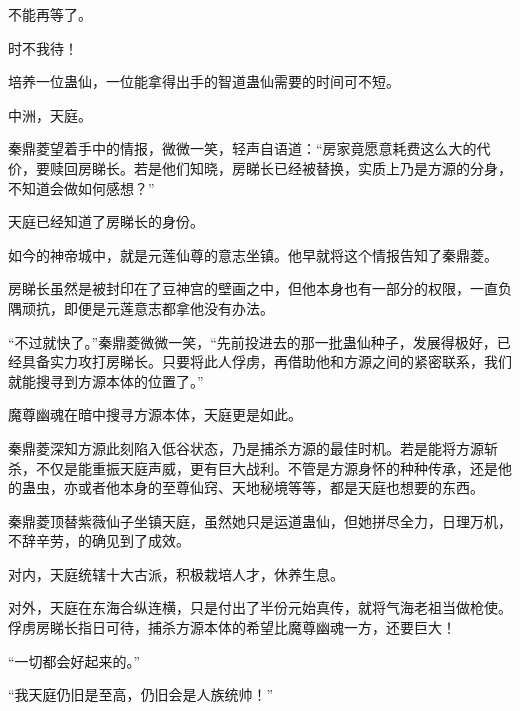 \begin{this_body}
不能再等了。

时不我待！

培养一位蛊仙，一位能拿得出手的智道蛊仙需要的时间可不短。

中洲，天庭。

秦鼎菱望着手中的情报，微微一笑，轻声自语道：“房家竟愿意耗费这么大的代价，要赎回房睇长。若是他们知晓，房睇长已经被替换，实质上乃是方源的分身，不知道会做如何感想？”

天庭已经知道了房睇长的身份。

如今的神帝城中，就是元莲仙尊的意志坐镇。他早就将这个情报告知了秦鼎菱。

房睇长虽然是被封印在了豆神宫的壁画之中，但他本身也有一部分的权限，一直负隅顽抗，即便是元莲意志都拿他没有办法。

“不过就快了。”秦鼎菱微微一笑，“先前投进去的那一批蛊仙种子，发展得极好，已经具备实力攻打房睇长。只要将此人俘虏，再借助他和方源之间的紧密联系，我们就能搜寻到方源本体的位置了。”

魔尊幽魂在暗中搜寻方源本体，天庭更是如此。

秦鼎菱深知方源此刻陷入低谷状态，乃是捕杀方源的最佳时机。若是能将方源斩杀，不仅是能重振天庭声威，更有巨大战利。不管是方源身怀的种种传承，还是他的蛊虫，亦或者他本身的至尊仙窍、天地秘境等等，都是天庭也想要的东西。

秦鼎菱顶替紫薇仙子坐镇天庭，虽然她只是运道蛊仙，但她拼尽全力，日理万机，不辞辛劳，的确见到了成效。

对内，天庭统辖十大古派，积极栽培人才，休养生息。

对外，天庭在东海合纵连横，只是付出了半份元始真传，就将气海老祖当做枪使。俘虏房睇长指日可待，捕杀方源本体的希望比魔尊幽魂一方，还要巨大！

“一切都会好起来的。”

“我天庭仍旧是至高，仍旧会是人族统帅！”

\end{this_body}

